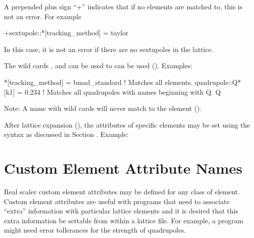 {{A prepended plus sign ``+'' indicates that if no elements are matched to, this
is not an error. For example
\begin{example}
  +sextupole::*[tracking_method] = taylor
\end{example}
In this case, it is not an error if there are no sextupoles in the lattice.

The wild cards , and  can be used to can be used
(). Examples:
\begin{example}
  *[tracking_method] = bmad_standard  ! Matches all elements.
  quadrupole::Q*[k1] = 0.234    ! Matches all quadrupoles with names beginning with Q.
  Q%
\end{example}
Note: A name with wild cards will never match to the  element ().

After lattice expansion (), the attributes of specific elements
may be set using the syntax as discussed in Section . Example:

\section{Custom Element Attribute Names}
\label{s:custom.attrib}

Real scaler custom element attributes may be defined for any class of
element.  Custom element attributes are useful with programs that need
to associate ``extra'' information with particular lattice elements
and it is desired that this extra information be settable from within
a lattice file. For example, a program might need error tollerances
for the strength of quadrupoles.

}}
